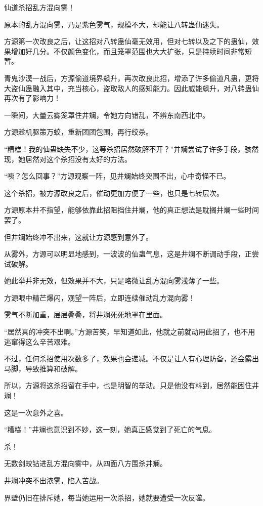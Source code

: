 \begin{this_body}
仙道杀招乱方混向雾！

原本的乱方混向雾，乃是紫色雾气，规模不大，却能让八转蛊仙迷失。

方源第一次改良之后，让这招对八转蛊仙毫无效用，但对七转以及之下的蛊仙，效果增加好几分。不仅颜色变化，而且笼罩范围也大大扩张，只是持续时间非常短暂。

青鬼沙漠一战后，方源偷道境界飙升，再次改良此招，增添了许多偷道凡蛊，更将大盗仙蛊融入其中，充当核心，盗取敌人的感知能力。因此威能飙升，对八转蛊仙再次有了影响力！

一瞬间，大量云雾笼罩住井斓，令她方向错乱，不辨东南西北中。

方源趁机驱策万蛟，重新团团包围，再行绞杀。

“糟糕！我的仙蛊缺失不少，这等杀招居然破解不开？”井斓尝试了许多手段，骇然现，她居然对这个杀招没有太好的方法。

“咦？怎么回事？”方源观察一阵，见井斓始终突围不出，心中奇怪不已。

这个杀招，被方源改良之后，催动更加方便了一些，也只是七转层次。

方源原本并不指望，能够依靠此招阻挡住井斓，他的真正想法是耽搁井斓一些时间罢了。

但井斓始终冲不出来，这就让方源感到意外了。

从雾外，方源可以明显地感到，一波波的仙蛊气息，这是井斓不断调动手段，正尝试破解。

她此举并非无效，但效果并不大，只是略微让乱方混向雾浅薄了一些。

方源眼中精芒爆闪，观望一阵后，立即连续催动乱方混向雾！

雾气不断加重，层层叠叠，将井斓死死地罩在里面。

“居然真的冲突不出啊。”方源苦笑，早知道如此，他就之前就动用此招了，也不用逃窜得这么辛苦艰难。

不过，任何杀招使用次数多了，效果也会递减。不仅是让人有心理防备，还会露出马脚，导致推算和破解。

所以，方源将这杀招留在手中，也是明智的举动。只是他没有料到，居然能困住井斓！

这是一次意外之喜。

“糟糕！”井斓也意识到不妙，这一刻，她真正感觉到了死亡的气息。

杀！

无数剑蛟钻进乱方混向雾中，从四面八方围杀井斓。

井斓冲突不出浓雾，陷入苦战。

界壁仍旧在排斥她，每当她运用一次杀招，她就要遭受一次反噬。


\end{this_body}
